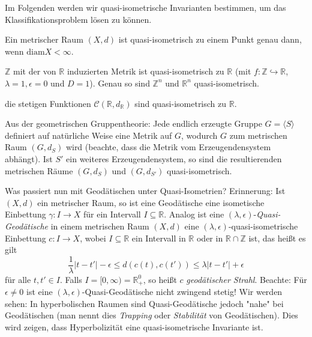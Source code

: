 \documentclass[11pt]{book}
\numberwithin{dummy}{section}
\theoremstyle{nonumberbreak}
\newenvironment{defin}[1][]{\ifthenelse{\equal{#1}{}}{\definition}{\definition[#1]}\rm}{\enddefinition}
\newenvironment{ex}[1][]{\ifthenelse{\equal{#1}{}}{\example}{\example[#1]}\rm}{\endexample}
\newcommand{\Z}{\mathbb{Z}}
\newcommand{\R}{\mathbb{R}}
\newcommand{\la}{\longrightarrow}
\begin{document}
\begin{spacing}{1.4}
\begin{defin}
\begin{compactenum}
\end{compactenum}

\end{defin}

Im Folgenden werden wir quasi-isometrische Invarianten bestimmen, um das Klassifikationsproblem lösen zu können.


\begin{ex}
\begin{compactenum}
\item Ein metrischer Raum $(X,d)$ ist quasi-isometrisch zu einem Punkt genau dann, wenn $\mathrm{diam} X < \infty$.
\item $\Z$ mit der von $\R$ induzierten Metrik ist quasi-isometrisch zu $\R$ (mit $f: \Z \hookrightarrow \R$, $\lambda =1, \epsilon=0$ und $D=1$). Genau so sind $\Z^n$ und $\R^n$ quasi-isometrisch.
\item die stetigen Funktionen $\mathcal{C}(\R,d_{\R})$ sind quasi-isometrisch zu $\R$.
\item Aus der geometrischen Gruppentheorie: Jede endlich erzeugte Gruppe $G= \langle S\rangle$ definiert auf natürliche Weise eine Metrik auf $G$, wodurch $G$ zum metrischen Raum $(G,d_S)$ wird (beachte, dass die Metrik vom Erzeugendensystem abhängt). Ist $S'$ ein weiteres Erzeugendensystem, so sind die resultierenden metrischen Räume $(G,d_S)$ und $(G,d_{S'})$ quasi-isometrisch.

\end{compactenum}
\end{ex}



Was passiert nun mit Geodätischen unter Quasi-Isometrien? Erinnerung: Ist $(X,d)$ ein metrischer Raum, so ist eine Geodätische eine isometische Einbettung $\gamma: I \la X$ für ein Intervall $I \subseteq \R$. Analog ist eine $(\lambda, \epsilon)$-\textit{Quasi-Geodätische} in einem metrischen Raum $(X,d)$ eine $(\lambda, \epsilon)$-quasi-isometrische Einbettung $c: I \la X$, wobei $I\subseteq \R$ ein Intervall in $\R$ oder in $\R \cap \Z$ ist, das heißt es gilt 
$$\frac{1}{\lambda} \vert t- t'\vert - \epsilon \leqslant d(c(t), c(t')) \leqslant \lambda \vert t-t'\vert + \epsilon$$
für alle $t,t' \in I$. Falls $I= [0,\infty) = \R_+^0$, so heißt $c$ \textit{geodätischer Strahl}. Beachte: Für $\epsilon\neq0$ ist eine $(\lambda, \epsilon)$-Quasi-Geodätische nicht zwingend stetig! Wir werden sehen: In hyperbolischen Raumen sind Quasi-Geodätische jedoch "nahe" bei Geodätischen (man nennt dies \textit{Trapping} oder \textit{Stabilität} von Geodätischen). Dies wird zeigen, dass Hyperbolizität eine quasi-isometrische Invariante ist.



\end{spacing}
\end{document}
